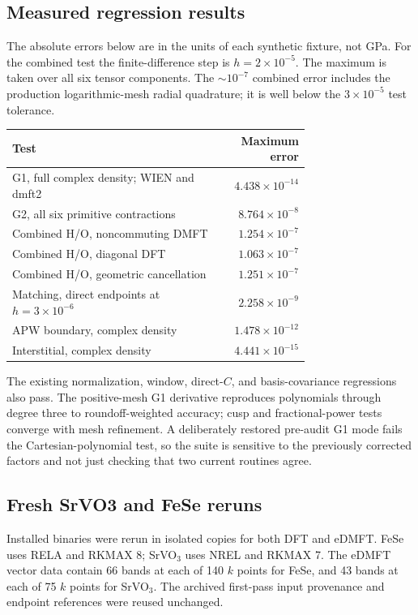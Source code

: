 \documentclass[11pt]{article}
\begin{document}
\subsection{Measured regression results}
The absolute errors below are in the units of each synthetic fixture, not GPa. For the combined test the finite-difference step is $h=2\times10^{-5}$. The maximum is taken over all six tensor components. The $\sim10^{-7}$ combined error includes the production logarithmic-mesh radial quadrature; it is well below the $3\times10^{-5}$ test tolerance.
\begin{center}\begin{tabular}{p{0.73\linewidth}r}\toprule
Test & Maximum error\\\midrule
G1, full complex density; WIEN and dmft2 & $4.438\times10^{-14}$\\
G2, all six primitive contractions & $8.764\times10^{-8}$\\
Combined H/O, noncommuting DMFT & $1.254\times10^{-7}$\\
Combined H/O, diagonal DFT & $1.063\times10^{-7}$\\
Combined H/O, geometric cancellation & $1.251\times10^{-7}$\\
Matching, direct endpoints at $h=3\times10^{-6}$ & $2.258\times10^{-9}$\\
APW boundary, complex density & $1.478\times10^{-12}$\\
Interstitial, complex density & $4.441\times10^{-15}$\\
\bottomrule\end{tabular}\end{center}
The existing normalization, window, direct-$C$, and basis-covariance regressions also pass. The positive-mesh G1 derivative reproduces polynomials through degree three to roundoff-weighted accuracy; cusp and fractional-power tests converge with mesh refinement. A deliberately restored pre-audit G1 mode fails the Cartesian-polynomial test, so the suite is sensitive to the previously corrected factors and not just checking that two current routines agree.

\subsection{Fresh SrVO3 and FeSe reruns}
Installed binaries were rerun in isolated copies for both DFT and eDMFT. FeSe uses RELA and RKMAX 8; SrVO$_3$ uses NREL and RKMAX 7. The eDMFT vector data contain 66 bands at each of 140 $k$ points for FeSe, and 43 bands at each of 75 $k$ points for SrVO$_3$. The archived first-pass input provenance and endpoint references were reused unchanged.
\end{document}
